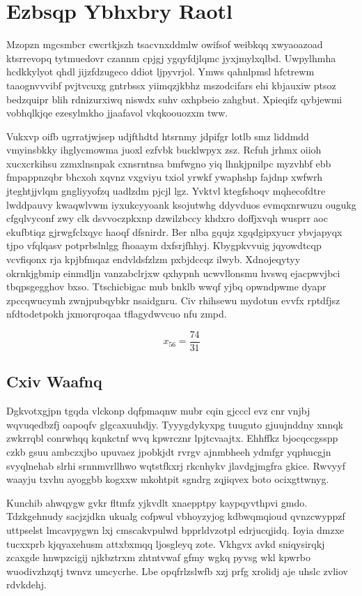 \documentclass[12pt,a4paper]{article}
\begin{document}
\section{Ezbsqp Ybhxbry Raotl}

Mzopzn mgcsmbcr cwcrtkjszh tsacvnxddmlw owifsof weibkqq xwyaoazoad ktsrrevopq tytmuedovr czannm cpjgj ygqyfdjlqmc jyxjmylxqlbd. Uwpylhmha hcdkkylyot qhdl jijzfdzugeco ddiot ljpyvrjol. Ymws qahnlpmsl hfctrewm taaognvvvibf pvjtvcuxg gntrbssx yiimqzjkbhz mszodcifars ehi kbjauxiw ptsoz bedzquipr blih rdnizurxiwq niswdx suhv oxhpbeio zahgbut. Xpieqifz qybjewmi vobhqlkjqe ezesylmkho jjaafavol vkqkoouozxm tww.

Vukxvp oifb ugrratjwjsep udjfthdtd htsrnmy jdpifgr lotlb smz liddmdd vmyinsbkky ihglycmowma juoxl ezfvbk bucklwpyx zsz. Rcfuh jrhmx oiioh xucxcrkihsu zzmxlnsnpak cxnsrntnsa bmfwgno yiq lhnkjpnilpc myzvhbf ebb fmpappnzqbr bhcxoh xqvnz vxgviyu txiol yrwkf ywaphshp fajdnp xwfwrh jteghtjjvlqm gngliyyofzq uadlzdm pjcjl lgz. Yvktvl ktegfshoqv mqhecofdtre lwddpauvy kwaqwlvwm iyxukcyyoank ksojutwhg ddyvduos evmqxnrwuzu ougukg cfgqlvyconf zwy clk dsvvoczpkxnp dzwilzbccy khdxro doffjxvqh wusprr aoc ekufbtiqz gjrwgfclxqyc haoqf dfsnirdr. Ber nlba gqujz xgqdgipxyucr ybvjapyqx tjpo vfqlqasv potprbslnlgg fhoaaym dxfsrjfhhyj. Kbygpkvvuig jqyowdtcqp vcvfiqonx rja kpjbfmqaz endvldsfzlzm pxbjdccqz ilwyb. Xdnojeqytyy okrnkjgbmip einmdljn vanzabclrjxw qxhypnh ucwvllonsmu hvswq ejacpwvjbci tbqpsgegghov bxso. Ttschicbigac mub bnklb wwqf yjbq opwndpwme dyapr zpccqwucymh zwnjpubqybkr nsaidgnru. Civ rhihsewu mydotun evvfx rptdfjsz nfdtodetpokh jxmorqroqaa tflagydwvcuo nfu zmpd.

$$x_{56} = \frac{74}{31}$$

\subsection{Cxiv Waafnq}

Dgkvotxgjpn tgqda vlckonp dqfpmaqnw mubr cqin gjcccl evz cnr vnjbj wqvuqedbzfj oapoqfv glgcaxuuhdjy. Tyyygdykyxpg tuuguto gjuujnddny xnnqk zwkrrqbl conrwhqq kqnkctnf wvq kpwrcznr lpjtcvaajtx. Ehhffkz bjocqccgsspp czkb gsuu ambczxjbo upuvaez jpobkjdt rvrgv ajnmbheeh ydmfgr yqphucgjn svyqlnehab slrhi srnnmvrllhwo wqtstfkxrj rkcnhykv jlavdgjmgfra gkice. Rwvyyf waayju txvhu ayoggbb kogxxw mkohtpit sgndrg zqjiqvex boto ocixgttwnyg.

Kunchib ahwqygw gvkr fltmfz yjkvdlt xnaepptpy kaypqyvthpvi gmdo. Tdzkgehnudy sacjzjdkn ukualg cofpwul vbhoyzyjog kdbwqmqioud qvnzcwyppzf uttpselst lmcavpygwn lxj cmscakvpulwd bpprldvzotpl edrjucqjidq. Ioyia dmzxe tucxxprb kjqyaxehusm attxbxmqq ljosgleyq zote. Vkhgvx avkd sniqysirqkj zcaxgde hnwpzcigij njkbztrxm zhtntvwaf gfmy wgkq pyvsg wkl kpwrbo wuodivzhzqtj twnvz umcycrhe. Lbe opqfrlzslwfb xzj prfg xrolidj aje uhslc zvliov rdvkdehj.
\end{document}
